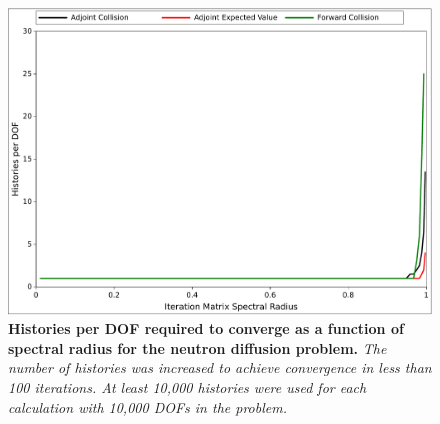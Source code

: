 \begin{figure}[t!]
  \begin{center}
    \includegraphics[width=6in]{chapters/spn_equations/breakdown_histories.pdf}
  \end{center}
  \caption{\textbf{Histories per DOF required to converge as a
      function of spectral radius for the neutron diffusion problem.}
    \textit{The number of histories was increased to achieve
      convergence in less than 100 iterations. At least 10,000
      histories were used for each calculation with 10,000 DOFs in the
      problem.}}
  \label{fig:breakdown_histories}
\end{figure}

